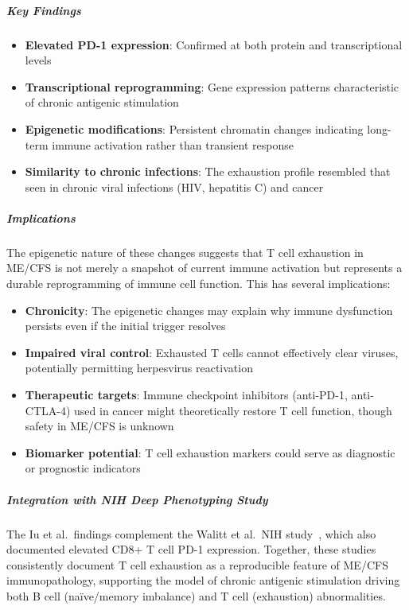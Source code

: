 \subparagraph{Key Findings}
\begin{itemize}
    \item \textbf{Elevated PD-1 expression}: Confirmed at both protein and transcriptional levels
    \item \textbf{Transcriptional reprogramming}: Gene expression patterns characteristic of chronic antigenic stimulation
    \item \textbf{Epigenetic modifications}: Persistent chromatin changes indicating long-term immune activation rather than transient response
    \item \textbf{Similarity to chronic infections}: The exhaustion profile resembled that seen in chronic viral infections (HIV, hepatitis C) and cancer
\end{itemize}

\subparagraph{Implications}
The epigenetic nature of these changes suggests that T cell exhaustion in ME/CFS is not merely a snapshot of current immune activation but represents a durable reprogramming of immune cell function. This has several implications:

\begin{itemize}
    \item \textbf{Chronicity}: The epigenetic changes may explain why immune dysfunction persists even if the initial trigger resolves
    \item \textbf{Impaired viral control}: Exhausted T cells cannot effectively clear viruses, potentially permitting herpesvirus reactivation
    \item \textbf{Therapeutic targets}: Immune checkpoint inhibitors (anti-PD-1, anti-CTLA-4) used in cancer might theoretically restore T cell function, though safety in ME/CFS is unknown
    \item \textbf{Biomarker potential}: T cell exhaustion markers could serve as diagnostic or prognostic indicators
\end{itemize}

\subparagraph{Integration with NIH Deep Phenotyping Study}
The Iu et al.\ findings complement the Walitt et al.\ NIH study~\cite{walitt2024deep}, which also documented elevated CD8+ T cell PD-1 expression. Together, these studies consistently document T cell exhaustion as a reproducible feature of ME/CFS immunopathology, supporting the model of chronic antigenic stimulation driving both B cell (naïve/memory imbalance) and T cell (exhaustion) abnormalities.



